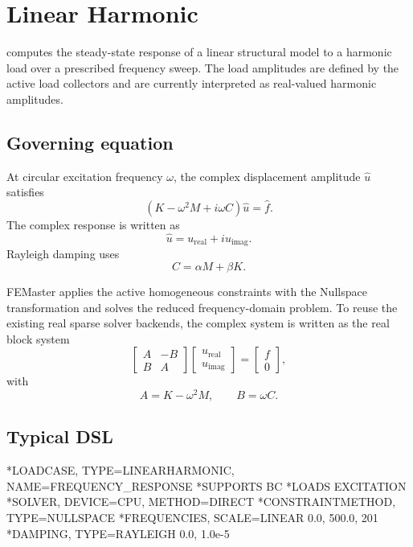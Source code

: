 \section{Linear Harmonic}
\label{sec:loadcase-linear-harmonic}

 computes the steady-state response of a linear structural model to a harmonic load over a prescribed frequency sweep. The load amplitudes are defined by the active load collectors and are currently interpreted as real-valued harmonic amplitudes.

\subsection{Governing equation}

At circular excitation frequency \(\omega\), the complex displacement amplitude \(\hat u\) satisfies
\[
\left(K-\omega^2 M+i\omega C\right)\hat u=\hat f .
\]
The complex response is written as
\[
\hat u=u_\mathrm{real}+i u_\mathrm{imag} .
\]
Rayleigh damping uses
\[
C=\alpha M+\beta K .
\]

FEMaster applies the active homogeneous constraints with the Nullspace transformation and solves the reduced frequency-domain problem. To reuse the existing real sparse solver backends, the complex system is written as the real block system
\[
\begin{bmatrix}
A & -B\\
B & A
\end{bmatrix}
\begin{bmatrix}
u_\mathrm{real}\\
u_\mathrm{imag}
\end{bmatrix}
=
\begin{bmatrix}
f\\0
\end{bmatrix},
\]
with
\[
A=K-\omega^2M,
\qquad
B=\omega C .
\]

\subsection{Typical DSL}

\begin{exampledeck}
*LOADCASE, TYPE=LINEARHARMONIC, NAME=FREQUENCY_RESPONSE
  *SUPPORTS
  BC
  *LOADS
  EXCITATION
  *SOLVER, DEVICE=CPU, METHOD=DIRECT
  *CONSTRAINTMETHOD, TYPE=NULLSPACE
  *FREQUENCIES, SCALE=LINEAR
  0.0, 500.0, 201
  *DAMPING, TYPE=RAYLEIGH
  0.0, 1.0e-5
\end{exampledeck}

